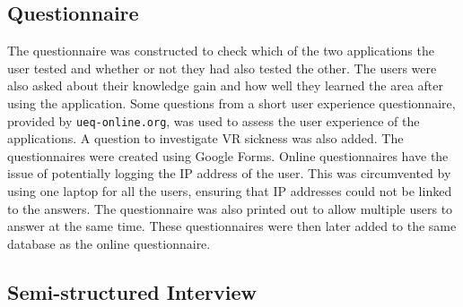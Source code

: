     
    \subsection*{Questionnaire}
        The questionnaire was constructed to check which of the two applications the user tested and whether or not they had also tested the other. The users were also asked about their knowledge gain and how well they learned the area after using the application. Some questions from a short user experience questionnaire, provided by \texttt{ueq-online.org}\cite{ueq_questionnaire}, was used to assess the user experience of the applications. A question to investigate VR sickness was also added. The questionnaires were created using Google Forms\cite{google_forms}. Online questionnaires have the issue of potentially logging the IP address of the user. This was circumvented by using one laptop for all the users, ensuring that IP addresses could not be linked to the answers. The questionnaire was also printed out to allow multiple users to answer at the same time. These questionnaires were then later added to the same database as the online questionnaire.
        
    
    \subsection*{Semi-structured Interview}
        
